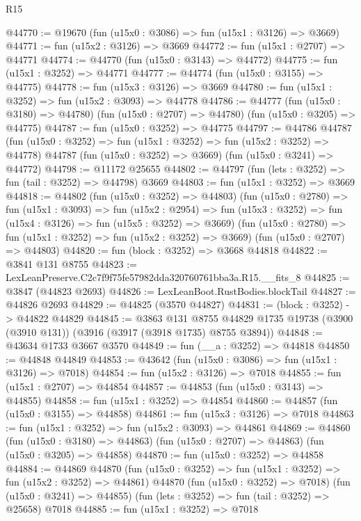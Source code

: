 \begin{lexlean}{R15}
\begin{coremodule}
@44770 := @19670 (fun (u15x0 : @3086) => fun (u15x1 : @3126) => @3669)
@44771 := fun (u15x2 : @3126) => @3669
@44772 := fun (u15x1 : @2707) => @44771
@44774 := @44770 (fun (u15x0 : @3143) => @44772)
@44775 := fun (u15x1 : @3252) => @44771
@44777 := @44774 (fun (u15x0 : @3155) => @44775)
@44778 := fun (u15x3 : @3126) => @3669
@44780 := fun (u15x1 : @3252) => fun (u15x2 : @3093) => @44778
@44786 := @44777
    (fun (u15x0 : @3180) => @44780)
    (fun (u15x0 : @2707) => @44780)
    (fun (u15x0 : @3205) => @44775)
@44787 := fun (u15x0 : @3252) => @44775
@44797 := @44786
    @44787
    (fun (u15x0 : @3252) => fun (u15x1 : @3252) => fun (u15x2 : @3252) => @44778)
    @44787
    (fun (u15x0 : @3252) => @3669)
    (fun (u15x0 : @3241) => @44772)
@44798 := @11172 @25655
@44802 := @44797 (fun (lets : @3252) => fun (tail : @3252) => @44798) @3669
@44803 := fun (u15x1 : @3252) => @3669
@44818 := @44802
    (fun (u15x0 : @3252) => @44803)
    (fun (u15x0 : @2780) =>
    fun (u15x1 : @3093) =>
    fun (u15x2 : @2954) =>
    fun (u15x3 : @3252) => fun (u15x4 : @3126) => fun (u15x5 : @3252) => @3669)
    (fun (u15x0 : @2780) => fun (u15x1 : @3252) => fun (u15x2 : @3252) => @3669)
    (fun (u15x0 : @2707) => @44803)
@44820 := fun (block : @3252) => @3668 @44818
@44822 := @3841 @131 @8755
@44823 := LexLeanPreserve.C2c7f9f75fe57982dda320760761bba3a.R15.__fits_8
@44825 := @3847 (@44823 @2693)
@44826 := LexLeanBoot.RustBodies.blockTail
@44827 := @44826 @2693
@44829 := @44825 (@3570 @44827)
@44831 := (block : @3252) -> @44822 @44829
@44845 := @3863
    @131
    @8755
    @44829
    @1735
    @19738
    (@3900 (@3910 @131))
    (@3916 (@3917 (@3918 @1735) @8755 @3894))
@44848 := @43634 @1733 @3667 @3570
@44849 := fun (__a : @3252) => @44818
@44850 := @44848 @44849
@44853 := @43642 (fun (u15x0 : @3086) => fun (u15x1 : @3126) => @7018)
@44854 := fun (u15x2 : @3126) => @7018
@44855 := fun (u15x1 : @2707) => @44854
@44857 := @44853 (fun (u15x0 : @3143) => @44855)
@44858 := fun (u15x1 : @3252) => @44854
@44860 := @44857 (fun (u15x0 : @3155) => @44858)
@44861 := fun (u15x3 : @3126) => @7018
@44863 := fun (u15x1 : @3252) => fun (u15x2 : @3093) => @44861
@44869 := @44860
    (fun (u15x0 : @3180) => @44863)
    (fun (u15x0 : @2707) => @44863)
    (fun (u15x0 : @3205) => @44858)
@44870 := fun (u15x0 : @3252) => @44858
@44884 := @44869
    @44870
    (fun (u15x0 : @3252) => fun (u15x1 : @3252) => fun (u15x2 : @3252) => @44861)
    @44870
    (fun (u15x0 : @3252) => @7018)
    (fun (u15x0 : @3241) => @44855)
    (fun (lets : @3252) => fun (tail : @3252) => @25658)
    @7018
@44885 := fun (u15x1 : @3252) => @7018

\end{coremodule}
\end{lexlean}

